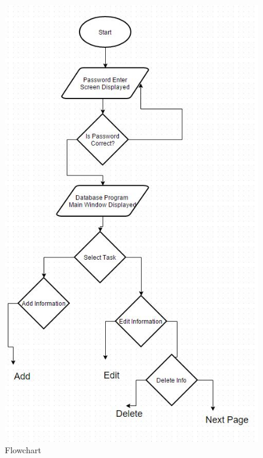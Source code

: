 \begin{figure}[H]
    \includegraphics[width=\textwidth]{DesignAlg1.JPG}
    \caption{Flowchart} \label{fig:Flowchart}
\end{figure}



